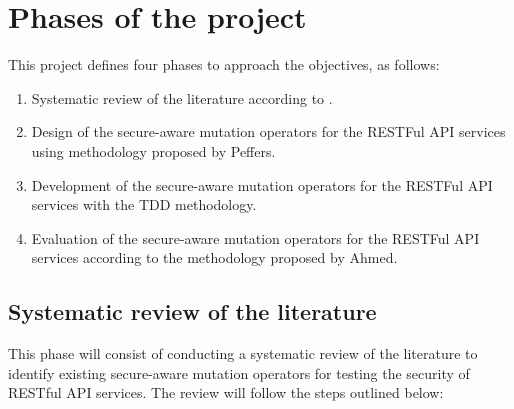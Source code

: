 \section{Phases of the project} \label{sec:phases}
This project defines four phases to approach the objectives, as follows:
  \begin{enumerate}
    \item Systematic review of the literature according to \cite{Kitchenham2002}.
    \item Design of the secure-aware mutation operators for the RESTFul API services using methodology proposed by Peffers\cite{Peffers2007}.
     \item Development of the secure-aware mutation operators for the RESTFul API services with the TDD methodology.
     \item Evaluation of the secure-aware mutation operators for the RESTFul API services according to the methodology proposed by Ahmed\cite{Ahmed2010}.
  \end{enumerate}

\subsection{Systematic review of the literature}

This phase will consist of conducting a systematic review of the literature to identify existing secure-aware mutation operators for testing the security of RESTful API services. The review will follow the steps outlined below:

